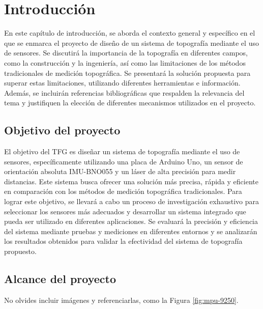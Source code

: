 \chapter{Introducción}
\label{cap:capitulo1}
\setcounter{page}{1}

En este capítulo de introducción, se aborda el contexto general y específico en el que se enmarca el proyecto de diseño de un sistema de topografía mediante el uso de sensores. Se discutirá la importancia de la topografía en diferentes campos, como la construcción y la ingeniería, así como las limitaciones de los métodos tradicionales de medición topográfica. Se presentará la solución propuesta para superar estas limitaciones, utilizando diferentes herramientas e información. Además, se incluirán referencias bibliográficas que respalden la relevancia del tema y justifiquen la elección de diferentes mecanismos utilizados en el proyecto.\\

\section{Objetivo del proyecto}
\label{sec:miseccion} %

El objetivo del TFG es diseñar un sistema de topografía mediante el uso de sensores, específicamente utilizando una placa de Arduino Uno, un sensor de orientación absoluta IMU-BNO055 y un láser de alta precisión para medir distancias. Este sistema busca ofrecer una solución más precisa, rápida y eficiente en comparación con los métodos de medición topográfica tradicionales. Para lograr este objetivo, se llevará a cabo un proceso de investigación exhaustivo para seleccionar los sensores más adecuados y desarrollar un sistema integrado que pueda ser utilizado en diferentes aplicaciones. Se evaluará la precisión y eficiencia del sistema mediante pruebas y mediciones en diferentes entornos y se analizarán los resultados obtenidos para validar la efectividad del sistema de topografía propuesto.

\section{Alcance del proyecto}
\label{sec:segundaseccion}

No olvides incluir imágenes y referenciarlas, como la Figura \ref{fig:mpu-9250}.

